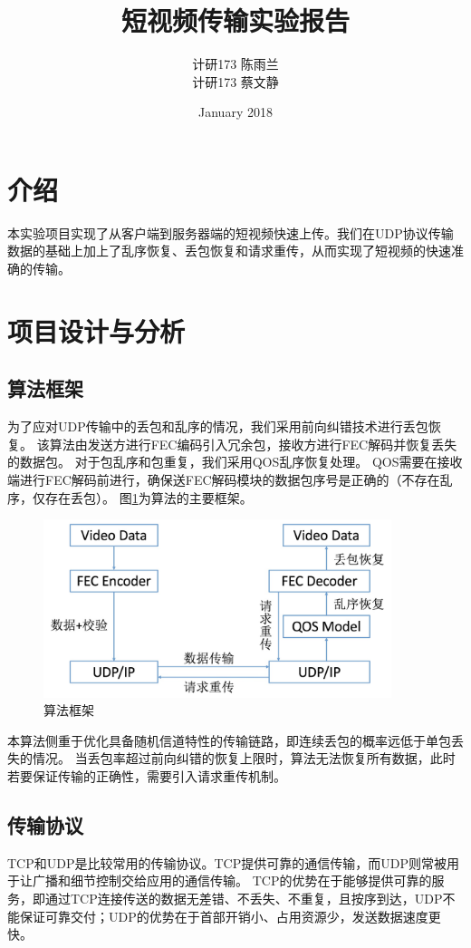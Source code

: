 \documentclass[onecolumn]{article}
\title{短视频传输实验报告}
\author{计研173 \quad 陈雨兰 \quad 2017310787  \\ 计研173 \quad 蔡文静 \quad 2017210866}
\date{January 2018}
\begin{document}
	\begin{CJK*}{UTF8}{gbsn}
		
		\maketitle
\section{介绍}
		本实验项目实现了从客户端到服务器端的短视频快速上传。我们在UDP协议传输数据的基础上加上了乱序恢复、丢包恢复和请求重传，从而实现了短视频的快速准确的传输。
		
\section{项目设计与分析}
		\subsection{算法框架}
		为了应对UDP传输中的丢包和乱序的情况，我们采用前向纠错技术进行丢包恢复。
		该算法由发送方进行FEC编码引入冗余包，接收方进行FEC解码并恢复丢失的数据包。
		对于包乱序和包重复，我们采用QOS乱序恢复处理。
		QOS需要在接收端进行FEC解码前进行，确保送FEC解码模块的数据包序号是正确的（不存在乱序，仅存在丢包）。
		图\ref{fig:frame}为算法的主要框架。
		
		\begin{figure}[h]
			\centering
			\includegraphics[width=4in]{frame.jpg}
			\caption{算法框架}
			\label{fig:frame}
		\end{figure}
		
		本算法侧重于优化具备随机信道特性的传输链路，即连续丢包的概率远低于单包丢失的情况。
		当丢包率超过前向纠错的恢复上限时，算法无法恢复所有数据，此时若要保证传输的正确性，需要引入请求重传机制。
		
		\subsection{传输协议}
		TCP和UDP是比较常用的传输协议。TCP提供可靠的通信传输，而UDP则常被用于让广播和细节控制交给应用的通信传输。
		TCP的优势在于能够提供可靠的服务，即通过TCP连接传送的数据无差错、不丢失、不重复，且按序到达，UDP不能保证可靠交付；UDP的优势在于首部开销小、占用资源少，发送数据速度更快。
		

\end{CJK*}
\end{document}
